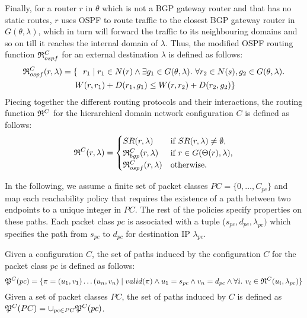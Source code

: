 Finally, for a router $r$ in $\theta$ which is not a BGP gateway 
router and that has no static routes, $r$ uses OSPF to route traffic to the closest BGP
gateway router in $G (\theta, \lambda)$, which in turn will forward  the traffic to its neighbouring domains and so on till it reaches the internal domain of $\lambda$.  Thus, the modified OSPF routing 
function $\mathfrak{R}^C_{ospf}$ for an external destination $\lambda$
is defined as follows: 
\begin{multline*}
\mathfrak{R}_{ospf}^C(r,\lambda) = \{~~r_1 \mid r_1 \in N(r) \wedge \exists g_1 \in G (\theta, \lambda). ~\forall r_2 \in N(s), g_2 \in G (\theta, \lambda). \\ ~W(r, r_1) + D(r_1, g_1) \leq
W(r, r_2) + D(r_2, g_2)\}
\end{multline*}
Piecing together the different routing protocols and their 
interactions, the routing function 
$\mathfrak{R}^C$ for the hierarchical domain network configuration $C$ is defined as follows: 
\[
\mathfrak{R}^C(r, \lambda) = 
\begin{cases}
SR(r, \lambda) & \text{if } SR(r, \lambda) \not= \emptyset, \\
\mathfrak{R}_{bgp}^C(r, \lambda) & \text{if }r \in G(\Theta(r), \lambda), \\
\mathfrak{R}_{ospf}^C(r, \lambda) & \text{otherwise.} 
\end{cases}
\]

In the following, we assume a finite set of packet classes $PC = \{0, \ldots, C_{pc}\}$ 
and map each reachability
policy that requires the existence of a path between two endpoints
to a unique integer in $PC$. The rest of the policies specify 
properties on these paths. Each packet class $pc$ is associated
with a tuple ($s_{pc}, d_{pc}, \lambda_{pc})$ which specifies 
the path from $s_{pc}$ to $d_{pc}$ for destination IP $\lambda_{pc}$.

\begin{definition} \label{def:inducedpaths}
Given a configuration $C$, the set of paths induced
by the configuration $C$ for the packet class $pc$ is defined as follows:
\[
\mathfrak{P}^C(pc) = \{\pi=(u_1, v_1)\ldots (u_n, v_n) \mid 
valid(\pi) \wedge 
u_1 = s_{pc} \wedge v_n= d_{pc} \wedge
\forall i. ~v_i \in \mathfrak{R}^C(u_i,\lambda_{pc})\}
\]
Given a set of packet classes $PC$, the set of paths
 induced by $C$ is defined as
$\mathfrak{P}^C(PC) = \cup_{pc\in PC} \mathfrak{P}^C(pc)$.
\end{definition}

